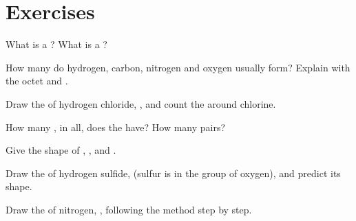 \section{Exercises}

\begin{exercise}[$\star$]\label{exo:g10:lewis-and-shape:1}
What is a ? What is a ?
\end{exercise}

\begin{exercise}[$\star$]\label{exo:g10:lewis-and-shape:2}
How many  do hydrogen, carbon, nitrogen and oxygen usually
form? Explain with the octet and .
\end{exercise}

\begin{exercise}[$\star$]\label{exo:g10:lewis-and-shape:3}
Draw the  of hydrogen chloride, , and count the
 around chlorine.
\end{exercise}

\begin{exercise}[$\star$]\label{exo:g10:lewis-and-shape:4}
How many , in all, does the   have? How
many pairs?
\end{exercise}

\begin{exercise}[$\star$]\label{exo:g10:lewis-and-shape:5}
Give the shape of , ,  and .
\end{exercise}

\begin{exercise}[$\star\star$]\label{exo:g10:lewis-and-shape:6}
Draw the  of hydrogen sulfide,  (sulfur is in the
group of oxygen), and predict its shape.
\end{exercise}

\begin{exercise}[$\star\star$]\label{exo:g10:lewis-and-shape:7}
Draw the  of nitrogen, , following the method step by
step.
\end{exercise}

